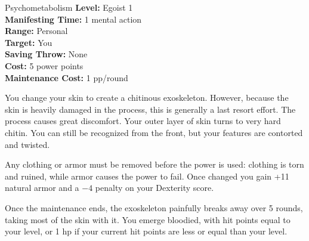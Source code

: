 {Psychometabolism}
{
	\textbf{Level:}
	Egoist 1\\
	\textbf{Manifesting Time:}
	1 mental action\\
	\textbf{Range:}
	Personal\\
	\textbf{Target:}
	You\\
	\textbf{Saving Throw:}
	None\\
	\textbf{Cost:}
	5 power points\\
	\textbf{Maintenance Cost:}
	1 pp/round\\
}
{
	You change your skin to create a chitinous exoskeleton. However, because the skin is heavily damaged in the process, this is generally a last resort effort. The process causes great discomfort. Your outer layer of skin turns to very hard chitin. You can still be recognized from the front, but your features are contorted and twisted.

	Any clothing or armor must be removed before the power is used: clothing is torn and ruined, while armor causes the power to fail. Once changed you gain +11 natural armor and a $-4$ penalty on your Dexterity score.

	Once the maintenance ends, the exoskeleton painfully breaks away over 5 rounds, taking most of the skin with it. You emerge bloodied, with hit points equal to your level, or 1 hp if your current hit points are less or equal than your level.
}